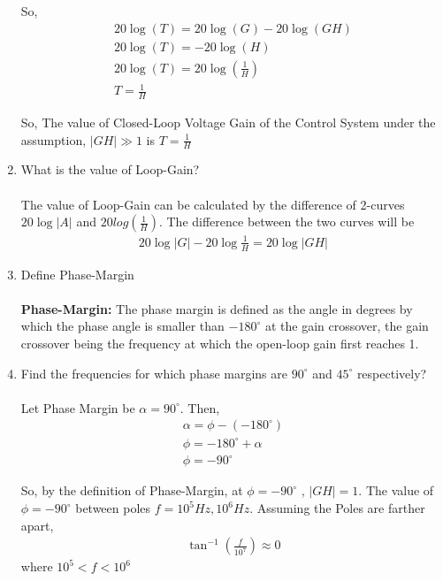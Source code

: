 \begin{enumerate}[label=\thesubsection.\arabic*.,ref=\thesubsection.\theenumi]
So,
\begin{align}
20\log(T) = 20\log(G) - 20\log(GH) \\
20\log(T) = -20\log(H) \\
20\log(T)= 20\log(\frac{1}{H})\\
T = \frac{1}{H}
\end{align}

So, The value of Closed-Loop Voltage Gain of the Control System under the assumption, $|GH| \gg 1$ is $T = \frac{1}{H}$\\

\item What is the value of Loop-Gain?\\
\solution\\
The value of Loop-Gain can be calculated by the difference of 2-curves $20\log|A|$ and $20log(\frac{1}{H})$. The difference between the two curves will be
\begin{align}
20 \log |G|-20 \log \frac{1}{H}=20 \log |GH|
\end{align}

\item Define Phase-Margin\\
\solution\\
\textbf{Phase-Margin:} The phase margin is defined as the angle in degrees by which the phase angle is smaller than $-180^{\circ}$ at the gain crossover, the gain crossover being the frequency at which the open-loop gain first reaches 1. \\

\item Find the frequencies for which phase margins are $90^{\circ}$ and $45^{\circ}$ respectively?\\
\solution\\
Let Phase Margin be $\alpha = 90^{\circ}$. Then,
\begin{align}
\alpha = \phi - (-180^{\circ})\\
\phi = -180^{\circ} + \alpha\\
\phi = -90^{\circ}
\end{align}

So, by the definition of Phase-Margin, at $\phi = -90^{\circ}$ , $|GH| = 1 $.  The value of $\phi = -90^{\circ}$ between poles $f=10^{5}Hz,10^{6}Hz$. Assuming the Poles are farther apart, 
\begin{align}
\tan^{-1}(\frac{f}{10^{7}}) \approx 0
\end{align}
where $10^{5} < f < 10^{6}$


\end{enumerate}
